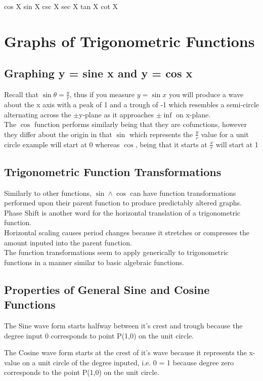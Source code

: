 \documentclass{article}
\begin{document}
cos X
sin X
csc X
sec X
tan X
cot X

\section{Graphs of Trigonometric Functions}
\subsection{Graphing y = sine x and y = cos x} 
Recall that $\sin\theta=\frac{y}{r}$, thus if you measure $y=\sin x$ you will
produce a wave about the x axis with a peak of 1 and a trough of -1 which
resembles a semi-circle alternating across the $\pm$y-plane as it approaches
$\pm\inf$ on x-plane.\\

The $\cos$ function performs similarly being that they are cofunctions, however
they differ about the origin in that $\sin$ which represents the $\frac{y}{r}$
value for a unit circle example will start at $0$ whereas $\cos$, being that
it starts at $\frac{x}{r}$ will start at 1

\subsection{Trigonometric Function Transformations}
Similarly to other functions, $\sin \land \cos$ can have function
transformations performed upon their parent function to produce predictably
altered graphs.\\
Phase Shift is another word for the horizontal translation of a
trigonometric function.\\
Horizontal scaling causes period changes because it stretches or compresses
the amount inputed into the parent function.\\
The function transformations seem to apply generically to trigonometric
functions in a manner similar to basic algebraic functions.

\subsection{Properties of General Sine and Cosine Functions}
The Sine wave form starts halfway between it's crest and trough because the
degree input 0 corresponds to point P(1,0) on the unit circle. 

The Cosine wave form starts at the crest of it's wave because it represents the
x-value on a unit circle of the degree inputed, i.e. 0 = 1 because degree
zero corresponds to the point P(1,0) on the unit circle.
\end{document}
